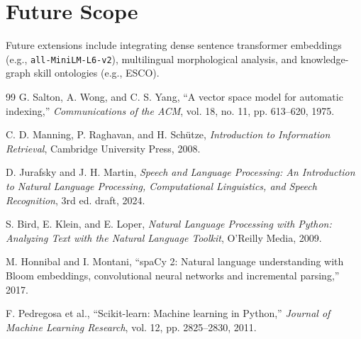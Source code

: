 \documentclass[12pt,a4paper]{report}
\begin{document}
\section{Future Scope}
Future extensions include integrating dense sentence transformer embeddings (e.g., \texttt{all-MiniLM-L6-v2}), multilingual morphological analysis, and knowledge-graph skill ontologies (e.g., ESCO).

\begin{thebibliography}{99}
G. Salton, A. Wong, and C. S. Yang, ``A vector space model for automatic indexing,'' \textit{Communications of the ACM}, vol. 18, no. 11, pp. 613--620, 1975.

C. D. Manning, P. Raghavan, and H. Schütze, \textit{Introduction to Information Retrieval}, Cambridge University Press, 2008.

D. Jurafsky and J. H. Martin, \textit{Speech and Language Processing: An Introduction to Natural Language Processing, Computational Linguistics, and Speech Recognition}, 3rd ed. draft, 2024.

S. Bird, E. Klein, and E. Loper, \textit{Natural Language Processing with Python: Analyzing Text with the Natural Language Toolkit}, O'Reilly Media, 2009.

M. Honnibal and I. Montani, ``spaCy 2: Natural language understanding with Bloom embeddings, convolutional neural networks and incremental parsing,'' 2017.

F. Pedregosa et al., ``Scikit-learn: Machine learning in Python,'' \textit{Journal of Machine Learning Research}, vol. 12, pp. 2825--2830, 2011.
\end{thebibliography}
\end{document}
